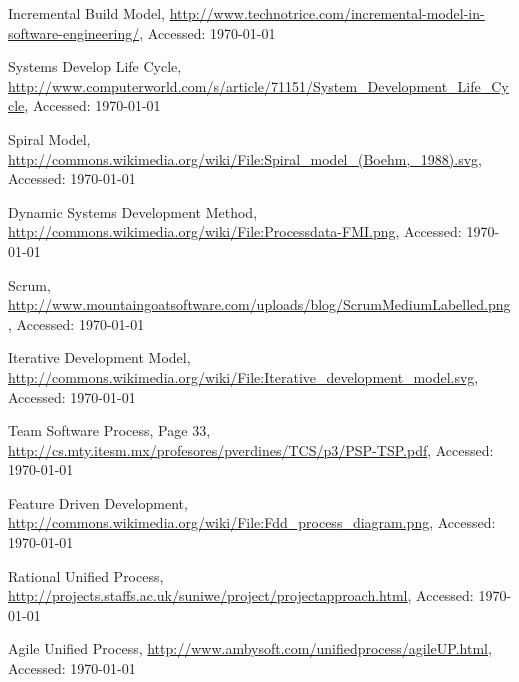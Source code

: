\documentclass[a4paper,10pt]{article}
\begin{document}
\clearpage
{}
\begin{thebibliography}{9}
 Incremental Build Model, \url{http://www.technotrice.com/incremental-model-in-software-engineering/}, Accessed: \today

 Systems Develop Life Cycle, \url{http://www.computerworld.com/s/article/71151/System_Development_Life_Cycle}, Accessed: \today

 Spiral Model, \url{http://commons.wikimedia.org/wiki/File:Spiral_model_(Boehm,_1988).svg}, Accessed: \today

 Dynamic Systems Development Method, \url{http://commons.wikimedia.org/wiki/File:Processdata-FMI.png}, Accessed: \today

 Scrum, \url{http://www.mountaingoatsoftware.com/uploads/blog/ScrumMediumLabelled.png}, Accessed: \today

 Iterative Development Model, \url{http://commons.wikimedia.org/wiki/File:Iterative_development_model.svg}, Accessed: \today

 Team Software Process, Page 33, \url{http://cs.mty.itesm.mx/profesores/pverdines/TCS/p3/PSP-TSP.pdf}, Accessed: \today

 Feature Driven Development, \url{http://commons.wikimedia.org/wiki/File:Fdd_process_diagram.png}, Accessed: \today

 Rational Unified Process, \url{http://projects.staffs.ac.uk/suniwe/project/projectapproach.html}, Accessed: \today

 Agile Unified Process, \url{http://www.ambysoft.com/unifiedprocess/agileUP.html}, Accessed: \today
\end{thebibliography}
\restoregeometry
\end{document}
